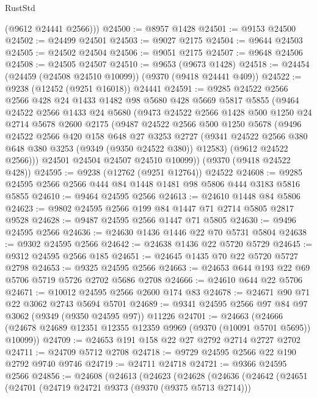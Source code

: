 \begin{lexlean}{RustStd}
\begin{coremodule}
        (@9612 @24441 @2566)))
@24500 := @8957 @1428
@24501 := @9153 @24500
@24502 := @24499 @24501
@24503 := @9027 @2175
@24504 := @9644 @24503
@24505 := @24502 @24504
@24506 := @9051 @2175
@24507 := @9648 @24506
@24508 := @24505 @24507
@24510 := @9653 (@9673 @1428)
@24518 := @24454 (@24459 (@24508 @24510 @10099)) (@9370 (@9418 @24441 @409))
@24522 := @9238 (@12452 (@9251 @16018)) @24441
@24591 := @9285
    @24522
    @2566
    @2566
    @428
    @24
    @1433
    @1482
    @98
    @5680
    @428
    @5669
    @5817
    @5855
    (@9464
      @24522
      @2566
      @1433
      @24
      @5680
      (@9473
        @24522
        @2566
        @1428
        @500
        @1250
        @24
        @2714
        @5678
        @2600
        @2175
        (@9487
          @24522
          @2566
          @500
          @1250
          @5678
          (@9496
            @24522
            @2566
            @420
            @158
            @648
            @27
            @3253
            @2727
            (@9341 @24522 @2566 @380 @648 @380 @3253 (@9349 (@9350 @24522 @380)) @12583)
            (@9612 @24522 @2566)))
        @24501
        @24504
        @24507
        @24510
        @10099))
    (@9370 (@9418 @24522 @428))
@24595 := @9238 (@12762 (@9251 @12764)) @24522
@24608 := @9285 @24595 @2566 @2566 @444 @84 @1448 @1481 @98 @5806 @444 @3183 @5816 @5855
@24610 := @9464 @24595 @2566
@24613 := @24610 @1448 @84 @5806
@24623 := @9802 @24595 @2566 @199 @84 @1447 @71 @2714 @5805 @2817 @9528
@24628 := @9487 @24595 @2566 @1447 @71 @5805
@24630 := @9496 @24595 @2566
@24636 := @24630 @1436 @1446 @22 @70 @5731 @5804
@24638 := @9302 @24595 @2566
@24642 := @24638 @1436 @22 @5720 @5729
@24645 := @9312 @24595 @2566 @185
@24651 := @24645 @1435 @70 @22 @5720 @5727 @2798
@24653 := @9325 @24595 @2566
@24663 := @24653 @644 @193 @22 @69 @5706 @5719 @5726 @2702 @5686 @2708
@24666 := @24610 @644 @22 @5706
@24671 := @10012 @24595 @2566 @2600 @174 @83
@24678 := @24671 @90 @71 @22 @3062 @2743 @5694 @5701
@24689 := @9341 @24595 @2566 @97 @84 @97 @3062 (@9349 (@9350 @24595 @97)) @11226
@24701 := @24663
    (@24666 (@24678 @24689 @12351 @12355 @12359 @9969 (@9370 (@10091 @5701 @5695)) @10099))
@24709 := @24653 @191 @158 @22 @27 @2792 @2714 @2727 @2702
@24711 := @24709 @5712 @2708
@24718 := @9729 @24595 @2566 @22 @190 @2792 @9740 @9746
@24719 := @24711 @24718
@24721 := @9366 @24595 @2566
@24856 := @24608
    (@24613
      (@24623
        (@24628
          (@24636
            (@24642
              (@24651
                (@24701
                  (@24719 @24721 @9373 (@9370 (@9375 @5713 @2714)))

\end{coremodule}
\end{lexlean}
